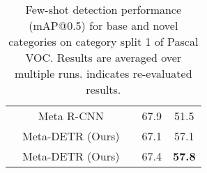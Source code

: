\documentclass[10pt,twocolumn,letterpaper]{article}
\begin{document}
\begin{table}
\begin{center}
{\begin{tabular}{ c | c c | c | c  }
& Meta R-CNN\;\cite{metarcnn} & & 67.9 & 51.5 \\

& \cellcolor{black!6} Meta-DETR (Ours) & \cellcolor{black!6} & \cellcolor{black!6}67.1 & \cellcolor{black!6}57.1 \\

& \cellcolor{black!6} Meta-DETR (Ours) & \cellcolor{black!6} & \cellcolor{black!6}67.4 & \cellcolor{black!6}\textbf{57.8}

\\\bottomrule
\end{tabular}
}
\end{center}
\vspace*{-1.2mm}
\caption{Few-shot detection performance (mAP@0.5) for base and novel categories on category split 1 of Pascal VOC. Results are averaged over multiple runs.  indicates re-evaluated results.}
\label{tab:Performance_VOC1_basenovel}
\vspace*{-1.0mm}
\end{table} 
\end{document}
